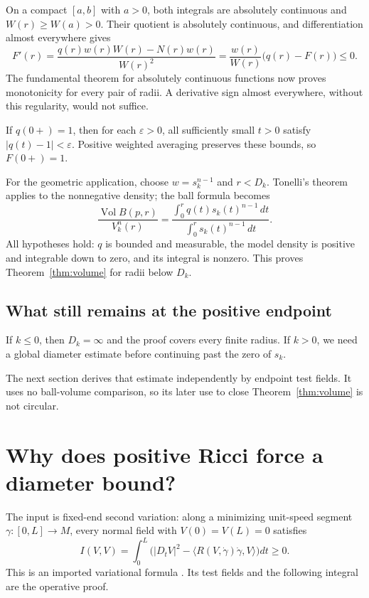 \documentclass[12pt,reqno]{amsart}
\begin{document}
On a compact \([a,b]\) with \(a>0\), both integrals are absolutely continuous and \(W(r)\ge W(a)>0\). Their quotient is absolutely continuous, and differentiation almost everywhere gives
\[
F'(r)=\frac{q(r)w(r)W(r)-N(r)w(r)}{W(r)^2}
=\frac{w(r)}{W(r)}\bigl(q(r)-F(r)\bigr)\le0.
\]
The fundamental theorem for absolutely continuous functions now proves monotonicity for every pair of radii. A derivative sign almost everywhere, without this regularity, would not suffice.

If \(q(0+)=1\), then for each \(\varepsilon>0\), all sufficiently small \(t>0\) satisfy \(|q(t)-1|<\varepsilon\). Positive weighted averaging preserves these bounds, so \(F(0+)=1\).

For the geometric application, choose \(w=s_k^{n-1}\) and \(r<D_k\). Tonelli's theorem applies to the nonnegative density; the ball formula becomes
\[
\frac{\operatorname{Vol}B(p,r)}{V_k^n(r)}
=\frac{\int_0^r q(t)s_k(t)^{n-1}\,dt}{\int_0^r s_k(t)^{n-1}\,dt}.
\]
All hypotheses hold: \(q\) is bounded and measurable, the model density is positive and integrable down to zero, and its integral is nonzero. This proves Theorem~\ref{thm:volume} for radii below \(D_k\).

\subsection{What still remains at the positive endpoint}
If \(k\le0\), then \(D_k=\infty\) and the proof covers every finite radius. If \(k>0\), we need a global diameter estimate before continuing past the zero of \(s_k\).

The next section derives that estimate independently by endpoint test fields. It uses no ball-volume comparison, so its later use to close Theorem~\ref{thm:volume} is not circular.
\section{Why does positive Ricci force a diameter bound?}
\label{sec:myers}

\begin{samepage}
\begin{theorem}
\label{thm:myers}

\end{theorem}
\end{samepage}

The input is fixed-end second variation: along a minimizing unit-speed segment \(\gamma:[0,L]\to M\), every normal field with \(V(0)=V(L)=0\) satisfies
\[
I(V,V)=\int_0^L\bigl(|D_tV|^2-\langle R(V,\dot\gamma)\dot\gamma,V\rangle\bigr)dt\ge0.
\]
This is an imported variational formula \cite[Section 7.1]{S-Bishop-2013v2}. Its test fields and the following integral are the operative proof.
\end{document}
